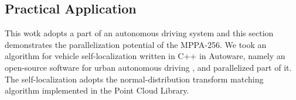 \documentclass[conference,compsoc]{IEEEtran}
\begin{document}

\vspace{-3mm}
\subsection{Practical Application}
\label{sec:practical_application}
\vspace{-3mm}
This wotk adopts a part of an autonomous driving system and this section demonstrates the parallelization potential of the MPPA-256.
We took an algorithm for vehicle self-localization written in C++ in Autoware, namely an open-source software for urban autonomous driving \cite{autoware}, and parallelized part of it.
The self-localization adopts the normal-distribution transform matching algorithm \cite{magnusson2009three} implemented in the Point Cloud Library.

\end{document}
